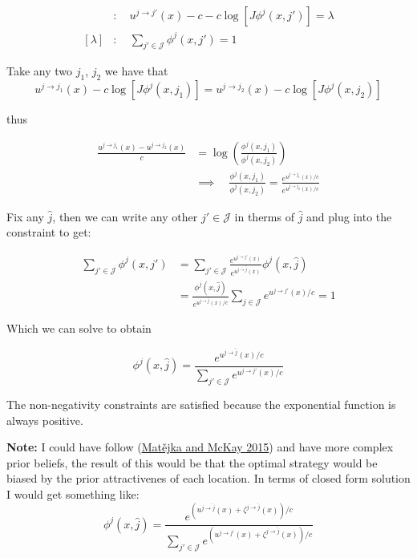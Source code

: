 \documentclass[
  letterpaper,
  DIV=11,
  numbers=noendperiod]{scrartcl}
\begin{document}
\begin{align*}
  [\phi^j(x, j')] &:\quad u^{j\to j'}(x) - c - c \log[J \phi^j(x, j')] = \lambda \\
  [\lambda] &: \quad \sum_{j'\in \mathcal{J}}\phi^j(x, j') = 1
\end{align*}

Take any two \(j_1\), \(j_2\) we have that
\[u^{j\to j_1}(x)  - c \log[J \phi^j(x, j_1)] =u^{j\to j_2}(x)  - c \log[J \phi^j(x, j_2)]\]

thus

\begin{align*}
  \frac{u^{j\to j_1}(x) - u^{j\to j_2}(x) }{c} &= \log\left(\frac{ \phi^j(x, j_1)}{ \phi^j(x, j_2)}\right) \\ 
  &\implies \quad \frac{ \phi^j(x, j_1)}{ \phi^j(x, j_2)} = \frac{
    e^{
       u^{j\to j_1}(x) / c 
        }
        }{e^{
u^{j\to j_2}(x) / c
        }
        }
\end{align*}

Fix any \(\hat{j}\), then we can write any other \(j'\in\mathcal{J}\) in
therms of \(\hat{j}\) and plug into the constraint to get:

\begin{align*}
  \sum_{j'\in \mathcal{J}}\phi^j(x, j') &= \sum_{j'\in \mathcal{J}}\frac{e^{u^{j\to j'}(x) }}{e^{u^{j\to \hat{j}}(x) }} \phi^j(x, \hat{j})\\  &= \frac{\phi^j(x, \hat{j})}{e^{u^{j\to \hat{j}}(x) / c}} \sum_{j\in \mathcal{J}}e^{u^{j\to j'}(x) / c} = 1
\end{align*}

Which we can solve to obtain

\begin{equation}
\label{eq:optimal-search-strategy}
    \phi^j(x,\hat{j}) = \frac{e^{u^{j\to \hat{j}}(x) / c}}{\sum_{ j' \in \mathcal{J}}e^{u^{j\to j'}(x) / c}}
\end{equation}

The non-negativity constraints are satisfied because the exponential
function is always positive.

\textbf{Note:} I could have follow
(\protect\hyperlink{ref-matejkaRationalInattentionDiscrete2015}{Matějka
and McKay 2015}) and have more complex prior beliefs, the result of this
would be that the optimal strategy would be biased by the prior
attractivenes of each location. In terms of closed form solution I would
get something like:
\[\phi^j(x,\hat{j}) = \frac{e^{(u^{j\to \hat{j}}(x) + \zeta^{j \to \hat{j}}(x) )/ c}}{\sum_{ j' \in \mathcal{J}}e^{(u^{j\to j'}(x) + \zeta^{j \to \hat{j}}(x)) / c}}\]
\end{document}
